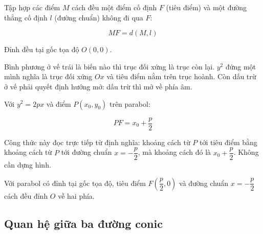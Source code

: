 \documentclass[11pt, a4paper]{article}
\begin{document}
\begin{dinhnghia}[{3 — Parabol}]
Tập hợp các điểm $M$ cách đều một điểm cố định $F$ (tiêu điểm) và một đường thẳng cố định $l$ (đường chuẩn) không đi qua $F$:

$$MF = d(M, l)$$
\end{dinhnghia}
\begin{dinhly}
Đỉnh đều tại gốc tọa độ $O(0, 0)$.


 Bình phương ở vế trái là biến nào thì trục đối xứng là trục còn lại. $y^2$ đứng một mình nghĩa là trục đối xứng $Ox$ và tiêu điểm nằm trên trục hoành. Còn dấu trừ ở vế phải quyết định hướng mở: dấu trừ thì mở về phía âm.
\end{dinhly}
\begin{dinhly}
Với $y^2 = 2px$ và điểm $P(x_0, y_0)$ trên parabol:

$$PF = x_0 + \frac{p}{2}$$

 Công thức này đọc trực tiếp từ định nghĩa: khoảng cách từ $P$ tới tiêu điểm bằng khoảng cách từ $P$ tới đường chuẩn $x = -\dfrac{p}{2}$, mà khoảng cách đó là $x_0 + \dfrac{p}{2}$. Không cần dựng hình.
\end{dinhly}
\begin{dinhly}
Với parabol có đỉnh tại gốc tọa độ, tiêu điểm $F\left(\dfrac{p}{2}, 0\right)$ và đường chuẩn $x = -\dfrac{p}{2}$ cách đều đỉnh $O$ về hai phía.
\end{dinhly}
\subsection{Quan hệ giữa ba đường conic}
\end{document}

